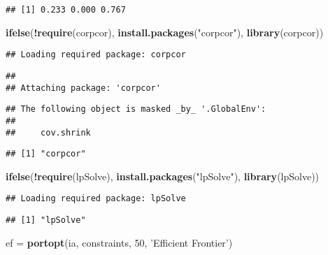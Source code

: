 \documentclass[]{article}
\newenvironment{Shaded}{\begin{snugshade}}{\end{snugshade}}
\newcommand{\DecValTok}[1]{\textcolor[rgb]{0.00,0.00,0.81}{#1}}
\newcommand{\KeywordTok}[1]{\textcolor[rgb]{0.13,0.29,0.53}{\textbf{#1}}}
\newcommand{\NormalTok}[1]{#1}
\newcommand{\OperatorTok}[1]{\textcolor[rgb]{0.81,0.36,0.00}{\textbf{#1}}}
\newcommand{\StringTok}[1]{\textcolor[rgb]{0.31,0.60,0.02}{#1}}
\begin{document}
\begin{verbatim}
## [1] 0.233 0.000 0.767
\end{verbatim}

\begin{Shaded}
\begin{Highlighting}[]
\KeywordTok{ifelse}\NormalTok{(}\OperatorTok{!}\KeywordTok{require}\NormalTok{(corpcor), }\KeywordTok{install.packages}\NormalTok{(}\StringTok{"corpcor"}\NormalTok{), }\KeywordTok{library}\NormalTok{(corpcor))}
\end{Highlighting}
\end{Shaded}

\begin{verbatim}
## Loading required package: corpcor
\end{verbatim}

\begin{verbatim}
## 
## Attaching package: 'corpcor'
\end{verbatim}

\begin{verbatim}
## The following object is masked _by_ '.GlobalEnv':
## 
##     cov.shrink
\end{verbatim}

\begin{verbatim}
## [1] "corpcor"
\end{verbatim}

\begin{Shaded}
\begin{Highlighting}[]
\KeywordTok{ifelse}\NormalTok{(}\OperatorTok{!}\KeywordTok{require}\NormalTok{(lpSolve), }\KeywordTok{install.packages}\NormalTok{(}\StringTok{"lpSolve"}\NormalTok{), }\KeywordTok{library}\NormalTok{(lpSolve))}
\end{Highlighting}
\end{Shaded}

\begin{verbatim}
## Loading required package: lpSolve
\end{verbatim}

\begin{verbatim}
## [1] "lpSolve"
\end{verbatim}

\begin{Shaded}
\begin{Highlighting}[]
\NormalTok{ef =}\StringTok{ }\KeywordTok{portopt}\NormalTok{(ia, constraints, }\DecValTok{50}\NormalTok{, }\StringTok{'Efficient Frontier'}\NormalTok{) }
\end{Highlighting}
\end{Shaded}
\end{document}
